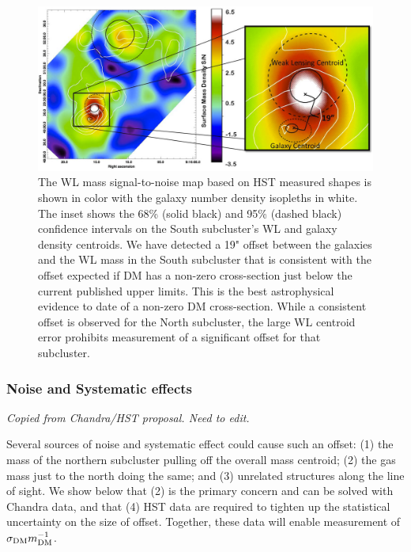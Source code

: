 \begin{figure}[t]
	\centering
	\includegraphics[width=6in]{Chapter4/WLgalaxyoffset.png}
	\caption[Musket Ball Cluster galaxy-weak lensing offset.]{
		\small{The WL mass signal-to-noise map based on HST measured shapes is shown in color with the galaxy number density isopleths in white.  
		The inset shows the 68\% (solid black) and 95\% (dashed black) confidence intervals on the South subcluster's WL and galaxy density centroids.  
		We have detected a 19" offset between the galaxies and the WL mass in the South subcluster that is consistent with the offset expected if DM has a non-zero cross-section just below the current published upper limits.  
		This is the best astrophysical evidence to date of a non-zero DM cross-section.  While a consistent offset is observed for the North subcluster, the large WL centroid error prohibits measurement of a significant offset for that subcluster.
		}
	}
	\label{fig2}
\end{figure}


\subsubsection{Noise and Systematic effects}

\textit{Copied from Chandra/HST proposal. Need to edit.}

Several sources of noise and systematic effect could cause such an offset:
(1) the mass of the northern subcluster pulling off the overall mass
centroid; (2) the gas mass just to the north doing the same; and (3)
unrelated structures along the line of sight. We show below that (2)
is the primary concern and can be solved with Chandra data, and that
(4) HST data are required to tighten up the statistical uncertainty on
the size of offset.  Together, these data will enable measurement of
$\sigma_{\rm DM}m_{\rm DM}^{-1}$.

